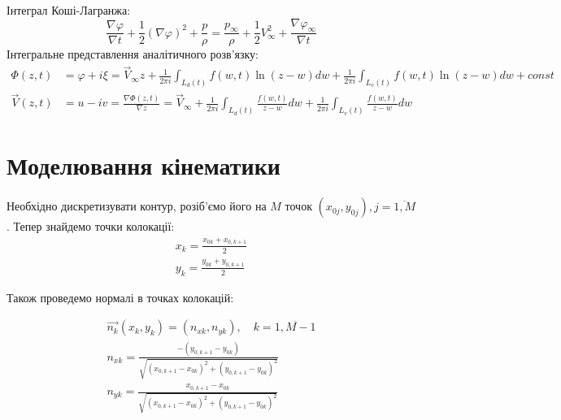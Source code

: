 \documentclass[a4paper,12pt]{article}
\begin{document}
	Інтеграл Коші-Лагранжа:
	\[
	\frac{\nabla \varphi}{\nabla t} + \frac{1}{2}\left( \nabla \varphi \right)^2 + \frac{p}{\rho} = \frac{p_{\infty}}{\rho} + \frac{1}{2} V_{\infty}^2 + \frac{\nabla \varphi_{\infty}}{\nabla t}
	\]
	Інтегральне представлення аналітичного розв'язку:
	\begin{align}
		\Phi(z,t) &= \varphi + i\xi = \vec{V}_\infty z + \frac{1}{2 \pi i} \int_{L_d(t)} f(w,t) \ln{(z - w)}dw + \frac{1}{2 \pi i} \int_{L_v(t)} f(w,t) \ln{(z - w)}dw + const \nonumber \\
		\vec{V}(z,t) &= u- iv = \frac{\nabla \Phi(z,t)}{\nabla z} = \vec{V}_\infty + \frac{1}{2 \pi i} \int_{L_d(t)} \frac{f(w,t)}{z - w} dw + \frac{1}{2 \pi i} \int_{L_v(t)} \frac{f(w,t)}{z - w} dw \nonumber
	\end{align}
\section{Моделювання кінематики}

	Необхідно дискретизувати контур, розіб'ємо його на $M$ точок $(x_{0j}, y_{0j}), j = \overline{1,M}$. Тепер знайдемо точки колокації:
	\begin{eqnarray}
		x_k = \frac{x_{0k} + x_{0, k+1}}{2} \nonumber \\
		y_k = \frac{y_{0k} + y_{0, k+1}}{2} \nonumber
	\end{eqnarray}
	
	Також проведемо нормалі в точках колокацій:
	
	\begin{align} 
		\overrightarrow{n_k} (x_k, y_k) = (n_{xk}, n_{yk}),\quad  k = \overline{1, M-1} \nonumber \\
		n_{xk} = \frac{-(y_{0,k+1} - y_{0k})}{\sqrt{(x_{0, k+1} -  x_{0k})^2 + (y_{0,k+1} - y_{0k})^2}} \nonumber \\
		n_{yk} = \frac{x_{0, k+1} -  x_{0k}}{\sqrt{(x_{0, k+1} -  x_{0k})^2 + (y_{0,k+1} - y_{0k})^2}} \nonumber
	\end{align}
	
\end{document}
